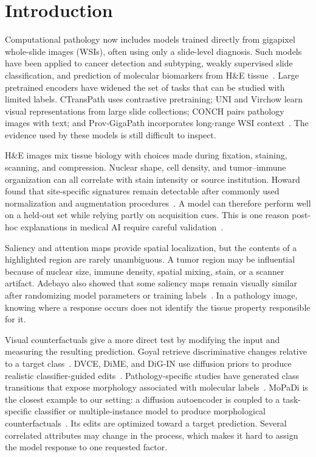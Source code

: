 \section{Introduction}
\label{sec:intro}

Computational pathology now includes models trained directly from gigapixel whole-slide images (WSIs), often using only a slide-level diagnosis. Such models have been applied to cancer detection and subtyping, weakly supervised slide classification, and prediction of molecular biomarkers from H\&E tissue~\cite{campanella2019clinical,lu2021clam,kather2019msi,shmatko2022ai}. Large pretrained encoders have widened the set of tasks that can be studied with limited labels. CTransPath uses contrastive pretraining; UNI and Virchow learn visual representations from large slide collections; CONCH pairs pathology images with text; and Prov-GigaPath incorporates long-range WSI context~\cite{wang2022ctranspath,chen2024uni,lu2024conch,vorontsov2024virchow,xu2024gigapath}. The evidence used by these models is still difficult to inspect.

H\&E images mix tissue biology with choices made during fixation, staining, scanning, and compression. Nuclear shape, cell density, and tumor--immune organization can all correlate with stain intensity or source institution. Howard \etal{} found that site-specific signatures remain detectable after commonly used normalization and augmentation procedures~\cite{howard2021sitespecific}. A model can therefore perform well on a held-out set while relying partly on acquisition cues. This is one reason post-hoc explanations in medical AI require careful validation~\cite{ghassemi2021falsehope,klauschen2024xai}.

Saliency and attention maps provide spatial localization, but the contents of a highlighted region are rarely unambiguous. A tumor region may be influential because of nuclear size, immune density, spatial mixing, stain, or a scanner artifact. Adebayo \etal{} also showed that some saliency maps remain visually similar after randomizing model parameters or training labels~\cite{adebayo2018sanity}. In a pathology image, knowing where a response occurs does not identify the tissue property responsible for it.

Visual counterfactuals give a more direct test by modifying the input and measuring the resulting prediction. Goyal \etal{} retrieve discriminative changes relative to a target class~\cite{goyal2019counterfactual}. DVCE, DiME, and DiG-IN use diffusion priors to produce realistic classifier-guided edits~\cite{augustin2022dvce,jeanneret2022dime,augustin2024digin}. Pathology-specific studies have generated class transitions that expose morphology associated with molecular labels~\cite{dolezal2023synthetic}. MoPaDi is the closest example to our setting: a diffusion autoencoder is coupled to a task-specific classifier or multiple-instance model to produce morphological counterfactuals~\cite{zigutyte2026mopadi}. Its edits are optimized toward a target prediction. Several correlated attributes may change in the process, which makes it hard to assign the model response to one requested factor.

